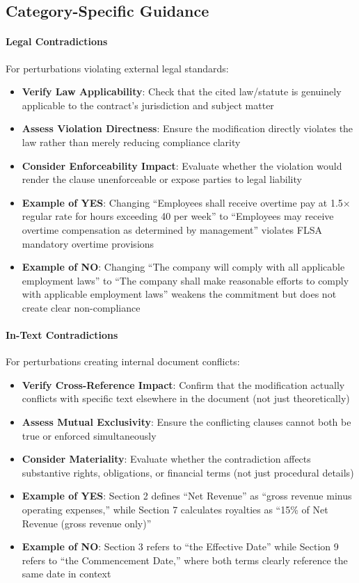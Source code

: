 \documentclass[11pt]{article}
\begin{document}
\subsection{Category-Specific Guidance}

\paragraph{Legal Contradictions} For perturbations violating external legal standards:
\begin{itemize}[leftmargin=*,itemsep=0.1em]
    \item \textbf{Verify Law Applicability}: Check that the cited law/statute is genuinely applicable to the contract's jurisdiction and subject matter
    \item \textbf{Assess Violation Directness}: Ensure the modification directly violates the law rather than merely reducing compliance clarity
    \item \textbf{Consider Enforceability Impact}: Evaluate whether the violation would render the clause unenforceable or expose parties to legal liability
    \item \textbf{Example of YES}: Changing ``Employees shall receive overtime pay at 1.5× regular rate for hours exceeding 40 per week'' to ``Employees may receive overtime compensation as determined by management'' violates FLSA mandatory overtime provisions
    \item \textbf{Example of NO}: Changing ``The company will comply with all applicable employment laws'' to ``The company shall make reasonable efforts to comply with applicable employment laws'' weakens the commitment but does not create clear non-compliance
\end{itemize}

\paragraph{In-Text Contradictions} For perturbations creating internal document conflicts:
\begin{itemize}[leftmargin=*,itemsep=0.1em]
    \item \textbf{Verify Cross-Reference Impact}: Confirm that the modification actually conflicts with specific text elsewhere in the document (not just theoretically)
    \item \textbf{Assess Mutual Exclusivity}: Ensure the conflicting clauses cannot both be true or enforced simultaneously
    \item \textbf{Consider Materiality}: Evaluate whether the contradiction affects substantive rights, obligations, or financial terms (not just procedural details)
    \item \textbf{Example of YES}: Section 2 defines ``Net Revenue'' as ``gross revenue minus operating expenses,'' while Section 7 calculates royalties as ``15\% of Net Revenue (gross revenue only)''
    \item \textbf{Example of NO}: Section 3 refers to ``the Effective Date'' while Section 9 refers to ``the Commencement Date,'' where both terms clearly reference the same date in context
\end{itemize}
\end{document}
